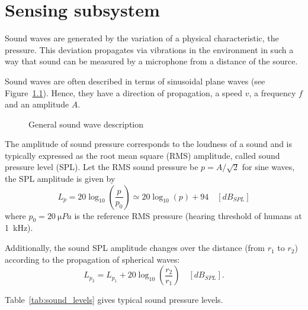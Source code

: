 \documentclass{EPL-master-thesis-covers-EN}
\begin{document}
\chapter{Sensing subsystem}

Sound waves are generated by the variation of a physical characteristic, the pressure. This deviation propagates via vibrations in the environment in such a way that sound can be measured by a microphone from a distance of the source.

Sound waves are often described in terms of sinusoidal plane waves (see Figure~\ref{fig:sound_wave}). Hence, they have a direction of propagation, a speed $v$, a frequency $f$ and an amplitude $A$. 

\begin{figure}[H]
\centering
{}
\caption{General sound wave description}
\label{fig:sound_wave}
\end{figure}

The amplitude of sound pressure corresponds to the loudness of a sound and is typically expressed as the root mean square (RMS) amplitude, called sound
pressure level (SPL). Let the RMS sound pressure be $p=A/\sqrt{2}$ for sine waves, the SPL amplitude is given by
\[
 L_p = 20\log_{10}\left(\frac{p}{p_0}\right) \simeq 20\log_{10}(p) + 94 \quad [\si{dB_{SPL}}]
\]
where $p_0=\SI{20}{\micro Pa}$ is the reference RMS pressure (hearing threshold of humans at \SI{1}{kHz}).

Additionally, the sound SPL amplitude changes over the distance (from $r_1$ to $r_2$) according to the propagation of spherical waves:
\[
 L_{p_2} = L_{p_1} + 20\log_{10}\left(\frac{r_2}{r_1}\right) \quad [\si{dB_{SPL}}].
\]

Table~\ref{tab:sound_levels} gives typical sound pressure levels.
\end{document}
